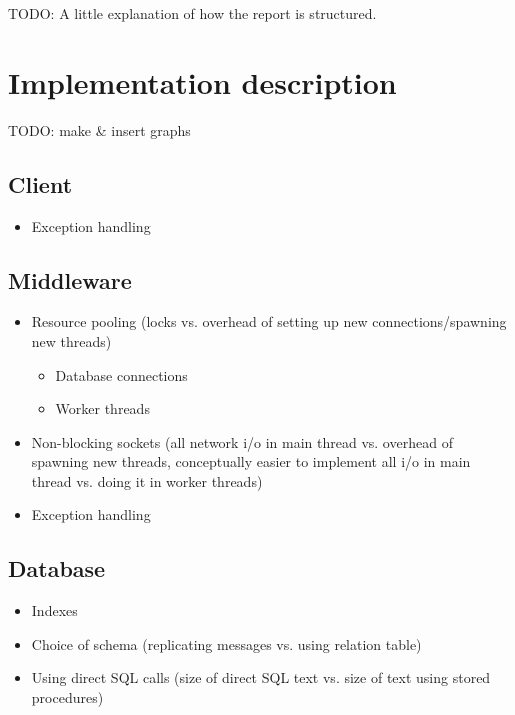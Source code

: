 \documentclass{article}
\begin{document}
    \maketitle

    TODO: A little explanation of how the report is structured.

    \section{Implementation description}
        TODO: make \& insert graphs

        \subsection{Client}
            \begin{itemize}
                \item Exception handling
            \end{itemize}
        \subsection{Middleware}
            \begin{itemize}
                \item Resource pooling (locks vs. overhead of setting up new connections/spawning new threads)
                \begin{itemize}
                    \item Database connections
                    \item Worker threads
                \end{itemize}
                \item Non-blocking sockets (all network i/o in main thread vs. overhead of spawning new threads, conceptually easier to implement all i/o in main thread vs. doing it in worker threads)
                \item Exception handling
            \end{itemize}
        \subsection{Database}
            \begin{itemize}
                \item Indexes
                \item Choice of schema (replicating messages vs. using relation table)
                \item Using direct SQL calls (size of direct SQL text vs. size of text using stored procedures)
            \end{itemize}
\end{document}
